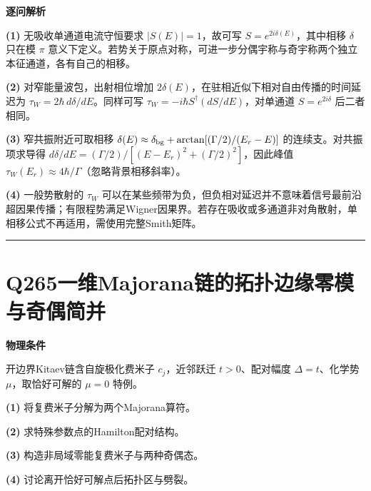 \documentclass[UTF8,a4paper,11pt,oneside,openany]{ctexbook}
\begin{document}
\par\medskip\noindent\textbf{逐问解析}
\par\noindent\textbf{(1)} 无吸收单通道电流守恒要求 \(|S(E)|=1\)，故可写 \(S=e^{2i\delta(E)}\)，其中相移 \(\delta\) 只在模 \(\pi\) 意义下定义。若势关于原点对称，可进一步分偶宇称与奇宇称两个独立本征通道，各有自己的相移。
\par\noindent\textbf{(2)} 对窄能量波包，出射相位增加 \(2\delta(E)\)，在驻相近似下相对自由传播的时间延迟为 \(\tau_W=2\hbar\,d\delta/dE\)。同样可写 \(\tau_W=-i\hbar S^\dagger(dS/dE)\)，对单通道 \(S=e^{2i\delta}\) 后二者相同。
\par\noindent\textbf{(3)} 窄共振附近可取相移 \(\delta(E)\approx\delta_{\rm bg}+\arctan[(\Gamma/2)/(E_r-E)]\) 的连续支。对共振项求导得 \(d\delta/dE=(\Gamma/2)/[(E-E_r)^2+(\Gamma/2)^2]\)，因此峰值 \(\tau_W(E_r)\approx4\hbar/\Gamma\)（忽略背景相移斜率）。
\par\noindent\textbf{(4)} 一般势散射的 \(\tau_W\) 可以在某些频带为负，但负相对延迟并不意味着信号最前沿超因果传播；有限程势满足Wigner因果界。若存在吸收或多通道非对角散射，单相移公式不再适用，需使用完整Smith矩阵。

\par\bigskip\hrule\bigskip
\section*{Q265\quad 一维Majorana链的拓扑边缘零模与奇偶简并}
\textbf{物理条件}\par 开边界Kitaev链含自旋极化费米子 \(c_j\)，近邻跃迁 \(t>0\)、配对幅度 \(\Delta=t\)、化学势 \(\mu\)，取恰好可解的 \(\mu=0\) 特例。
\par\noindent\textbf{(1)} 将复费米子分解为两个Majorana算符。
\par\noindent\textbf{(2)} 求特殊参数点的Hamilton配对结构。
\par\noindent\textbf{(3)} 构造非局域零能复费米子与两种奇偶态。
\par\noindent\textbf{(4)} 讨论离开恰好可解点后拓扑区与劈裂。
\end{document}
